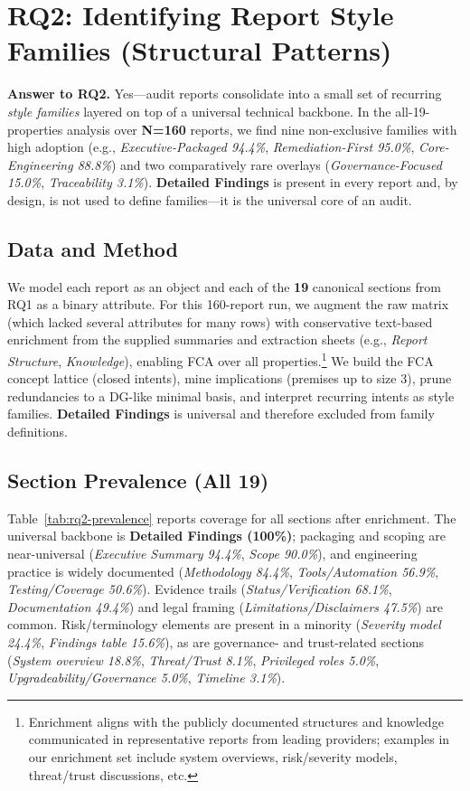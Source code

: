 
\section{RQ2: Identifying Report Style Families (Structural Patterns)}\label{sec:rq2}

\textbf{Answer to RQ2.} Yes---audit reports consolidate into a small set of recurring \emph{style families} layered on top of a universal technical backbone. In the all-19-properties analysis over \textbf{N=160} reports, we find nine non-exclusive families with high adoption (e.g., \emph{Executive-Packaged 94.4\%}, \emph{Remediation-First 95.0\%}, \emph{Core-Engineering 88.8\%}) and two comparatively rare overlays (\emph{Governance-Focused 15.0\%}, \emph{Traceability 3.1\%}). \textbf{Detailed Findings} is present in every report and, by design, is not used to define families---it is the universal core of an audit.

\subsection{Data and Method}
We model each report as an object and each of the \textbf{19} canonical sections from RQ1 as a binary attribute. For this 160-report run, we augment the raw matrix (which lacked several attributes for many rows) with conservative text-based enrichment from the supplied summaries and extraction sheets (e.g., \emph{Report Structure}, \emph{Knowledge}), enabling FCA over all properties.\footnote{Enrichment aligns with the publicly documented structures and knowledge communicated in representative reports from leading providers; examples in our enrichment set include system overviews, risk/severity models, threat/trust discussions, etc.} We build the FCA concept lattice (closed intents), mine implications (premises up to size 3), prune redundancies to a DG-like minimal basis, and interpret recurring intents as style families. \textbf{Detailed Findings} is universal and therefore excluded from family definitions.

\subsection{Section Prevalence (All 19)}
Table~\ref{tab:rq2-prevalence} reports coverage for all sections after enrichment. The universal backbone is \textbf{Detailed Findings (100\%)}; packaging and scoping are near-universal (\emph{Executive Summary 94.4\%}, \emph{Scope 90.0\%}), and engineering practice is widely documented (\emph{Methodology 84.4\%}, \emph{Tools/Automation 56.9\%}, \emph{Testing/Coverage 50.6\%}). Evidence trails (\emph{Status/Verification 68.1\%}, \emph{Documentation 49.4\%}) and legal framing (\emph{Limitations/Disclaimers 47.5\%}) are common. Risk/terminology elements are present in a minority (\emph{Severity model 24.4\%}, \emph{Findings table 15.6\%}), as are governance- and trust-related sections (\emph{System overview 18.8\%}, \emph{Threat/Trust 8.1\%}, \emph{Privileged roles 5.0\%}, \emph{Upgradeability/Governance 5.0\%}, \emph{Timeline 3.1\%}).

